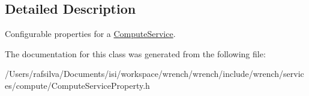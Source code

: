 \subsection{Detailed Description}
Configurable properties for a \hyperlink{classwrench_1_1_compute_service}{Compute\+Service}. 

The documentation for this class was generated from the following file\+:\begin{DoxyCompactItemize}
\item 
/\+Users/rafsilva/\+Documents/isi/workspace/wrench/wrench/include/wrench/services/compute/Compute\+Service\+Property.\+h\end{DoxyCompactItemize}
